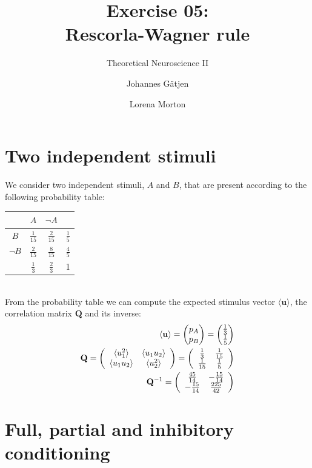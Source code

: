 \documentclass{scrartcl}
\title{Exercise 05:\\Rescorla-Wagner rule}
\subtitle{Theoretical Neuroscience II}
\author{Johannes G\"atjen \and Lorena Morton}
\newcommand*\colvec[3][]{
    \begin{pmatrix}\ifx\relax#1\relax\else#1\\\fi#2\\#3\end{pmatrix}
}
\begin{document}
\maketitle

\section{Two independent stimuli}

We consider two independent stimuli, $A$ and $B$, that are present according to the following probability table:\\
\begin{tabular}{c | c c | c}
& $A$ & $\neg A$ & \\  [3pt] \hline
$B$ & $\frac{1}{15}$ & $\frac{2}{15}$ & $\frac{1}{5}$ \\ [3pt]
$\neg B$ & $\frac{2}{15}$ & $\frac{8}{15}$ & $\frac{4}{5}$\\ [3pt] \hline
& $\frac{1}{3}$ & $\frac{2}{3}$ & 1 \\ [3pt]
\end{tabular}\\

From the probability table we can compute the expected stimulus vector $\langle \mathbf{u} \rangle$, the correlation matrix $\mathbf{Q}$ and its inverse:
\begin{align*}
\langle \mathbf{u} \rangle = \colvec{p_A}{p_B} = \colvec{\frac{1}{3}}{\frac{1}{5}}\\
\mathbf{Q} = \left( \begin{array}{cc}
\langle u_1^2 \rangle & \langle u_1u_2 \rangle \\
\langle u_1u_2 \rangle & \langle u_2^2 \rangle \end{array} \right) = \left( \begin{array}{cc}
\frac{1}{3} & \frac{1}{15} \\
\frac{1}{15} & \frac{1}{5} \end{array} \right) \\
\mathbf{Q}^{-1} = \left( \begin{array}{cc}
\frac{45}{14} & -\frac{15}{14} \\
-\frac{15}{14} & \frac{225}{42} \end{array} \right) 
\end{align*}

\section{Full, partial and inhibitory conditioning}
\end{document}
